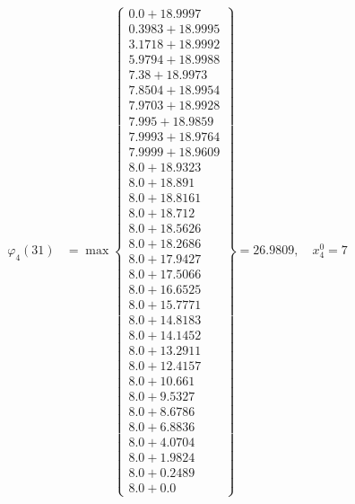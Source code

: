 \documentclass{article}
\begin{document}
\begin{align*}
\varphi_{4}(31) &= \max \left\{ \begin{array}{c}
0.0 + 18.9997 \\
 0.3983 + 18.9995 \\
 3.1718 + 18.9992 \\
 5.9794 + 18.9988 \\
 7.38 + 18.9973 \\
 7.8504 + 18.9954 \\
 7.9703 + 18.9928 \\
 7.995 + 18.9859 \\
 7.9993 + 18.9764 \\
 7.9999 + 18.9609 \\
 8.0 + 18.9323 \\
 8.0 + 18.891 \\
 8.0 + 18.8161 \\
 8.0 + 18.712 \\
 8.0 + 18.5626 \\
 8.0 + 18.2686 \\
 8.0 + 17.9427 \\
 8.0 + 17.5066 \\
 8.0 + 16.6525 \\
 8.0 + 15.7771 \\
 8.0 + 14.8183 \\
 8.0 + 14.1452 \\
 8.0 + 13.2911 \\
 8.0 + 12.4157 \\
 8.0 + 10.661 \\
 8.0 + 9.5327 \\
 8.0 + 8.6786 \\
 8.0 + 6.8836 \\
 8.0 + 4.0704 \\
 8.0 + 1.9824 \\
 8.0 + 0.2489 \\
 8.0 + 0.0
\end{array} \right\}=26.9809, \quad x_{4}^0=7\\
  

\end{align*}
\end{document}
